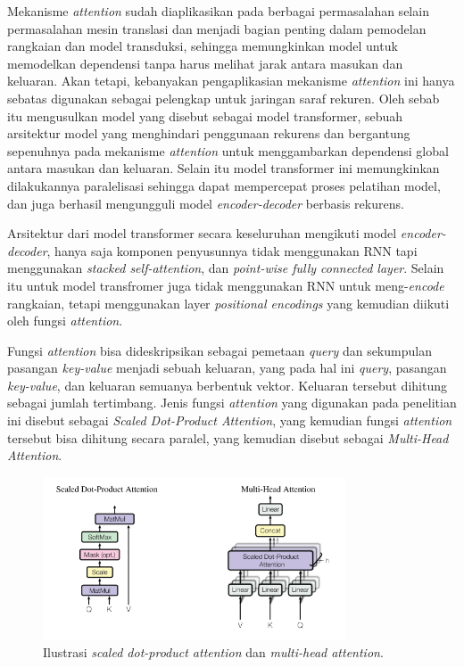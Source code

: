 Mekanisme \textit{attention} sudah diaplikasikan pada berbagai permasalahan selain permasalahan mesin translasi dan menjadi bagian penting dalam pemodelan rangkaian dan model transduksi, sehingga memungkinkan model untuk memodelkan dependensi tanpa harus melihat jarak antara masukan dan keluaran. Akan tetapi, kebanyakan pengaplikasian mekanisme \textit{attention} ini hanya sebatas digunakan sebagai pelengkap untuk jaringan saraf rekuren. Oleh sebab itu \textcite{Vaswani2017} mengusulkan model yang disebut sebagai model transformer, sebuah arsitektur model yang menghindari penggunaan rekurens dan bergantung sepenuhnya pada mekanisme \textit{attention} untuk menggambarkan dependensi global antara masukan dan keluaran. Selain itu model transformer ini memungkinkan dilakukannya paralelisasi sehingga dapat mempercepat proses pelatihan model, dan juga berhasil mengungguli model \textit{encoder-decoder} berbasis rekurens.
\bigskip

Arsitektur dari model transformer secara keseluruhan mengikuti model \textit{encoder-decoder}, hanya saja komponen penyusunnya tidak menggunakan RNN tapi menggunakan \textit{stacked self-attention}, dan \textit{point-wise fully connected layer}. Selain itu untuk model transfromer juga tidak menggunakan RNN untuk meng-\textit{encode} rangkaian, tetapi menggunakan layer \textit{positional encodings} yang kemudian diikuti oleh fungsi \textit{attention}.
\bigskip

Fungsi \textit{attention} bisa dideskripsikan sebagai pemetaan \textit{query} dan sekumpulan pasangan \textit{key-value} menjadi sebuah keluaran, yang pada hal ini \textit{query}, pasangan \textit{key-value}, dan keluaran semuanya berbentuk vektor. Keluaran tersebut dihitung sebagai jumlah tertimbang. Jenis fungsi \textit{attention} yang digunakan pada penelitian ini disebut sebagai \textit{Scaled Dot-Product Attention}, yang kemudian fungsi \textit{attention} tersebut bisa dihitung secara paralel, yang kemudian disebut sebagai \textit{Multi-Head Attention}.

\begin{figure}[h]
    \centering
    \includegraphics[width=0.8\textwidth]{resources/images/2-jenis-attention.png}
    \caption{Ilustrasi \textit{scaled dot-product attention} dan \textit{multi-head attention}. \parencite{Vaswani2017}}
    \label{fig:jenis-attention}
\end{figure}

